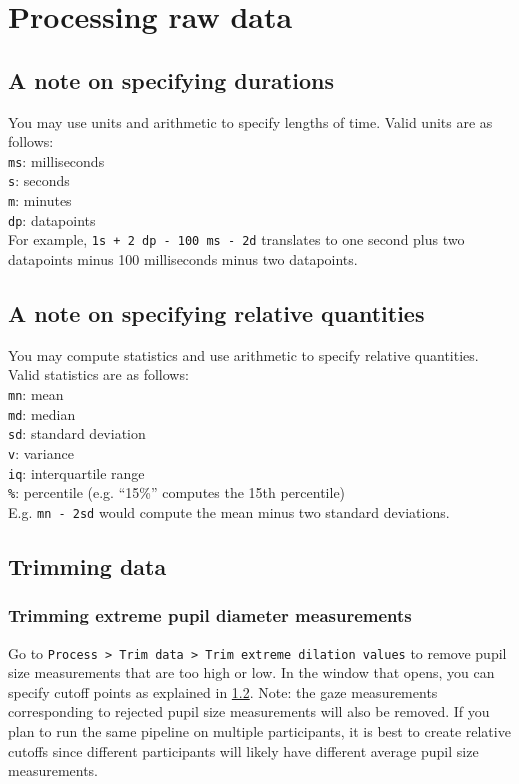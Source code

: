 \documentclass{article}
\begin{document}
\section{Processing raw data}
\subsection{A note on specifying durations} \label{timestr_explanation}
You may use units and arithmetic to specify lengths of time. Valid units are as follows:\\
\indent \texttt{ms}: milliseconds\\
\indent \texttt{s}: seconds\\
\indent \texttt{m}: minutes\\
\indent \texttt{dp}: datapoints\\
For example, \texttt{1s + 2 dp - 100 ms - 2d} translates to one second plus two datapoints minus 100 milliseconds minus two datapoints.
\subsection{A note on specifying relative quantities} \label{datastr_explanation}
You may compute statistics and use arithmetic to specify relative quantities. Valid statistics are as follows:\\
\indent \texttt{mn}: mean\\
\indent \texttt{md}: median\\
\indent \texttt{sd}: standard deviation\\
\indent \texttt{v}: variance\\
\indent \texttt{iq}: interquartile range\\
\indent \texttt{\%}: percentile (e.g. ``15\%'' computes the 15th percentile)\\
E.g. \texttt{mn - 2sd} would compute the mean minus two standard deviations.
\subsection{Trimming data}
\subsubsection{Trimming extreme pupil diameter measurements}
Go to \texttt{Process > Trim data > Trim extreme dilation values} to remove pupil size measurements that are too high or low. In the window that opens, you can specify cutoff points as explained in \ref{datastr_explanation}. Note: the gaze measurements corresponding to rejected pupil size measurements will also be removed. If you plan to run the same pipeline on multiple participants, it is best to create relative cutoffs since different participants will likely have different average pupil size measurements.
\end{document}
